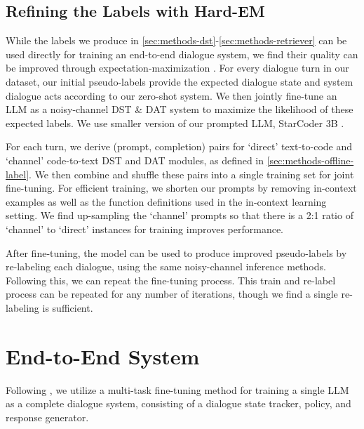 \documentclass[11pt]{article}
\begin{document}
\subsection{Refining the Labels with Hard-EM}
\label{sec:methods-re-labeling}

While the labels we produce in \autoref{sec:methods-dst}-\autoref{sec:methods-retriever} can be used directly for training an end-to-end dialogue system, we find their quality can be improved through expectation-maximization \cite{dempster_maximum_1977_fixed}.
For every dialogue turn in our dataset, our initial pseudo-labels provide the expected dialogue state and system dialogue acts according to our zero-shot system.
We then jointly fine-tune an LLM as a noisy-channel DST \& DAT system to maximize the likelihood of these expected labels.
We use smaller version of our prompted LLM, StarCoder 3B \cite{li2023starcoder}.

For each turn, we derive (prompt, completion) pairs for `direct' text-to-code and `channel' code-to-text DST and DAT modules, as defined in \autoref{sec:methods-offline-label}.
We then combine and shuffle these pairs into a single training set for joint fine-tuning.
For efficient training, we shorten our prompts by removing in-context examples as well as the function definitions used in the in-context learning setting. 
We find up-sampling the `channel' prompts so that there is a 2:1 ratio of `channel' to `direct' instances for training improves performance. 

After fine-tuning, the model can be used to produce improved pseudo-labels by re-labeling each dialogue, using the same noisy-channel inference methods. Following this, we can repeat the fine-tuning process.
This train and re-label process can be repeated for any number of iterations, though we find a single re-labeling is sufficient.

\section{End-to-End System}
\label{sec:methods-online-system}

Following \cite{su-etal-2022-multi}, we utilize a multi-task fine-tuning method for training a single LLM as a complete dialogue system, consisting of a dialogue state tracker, policy, and response generator.
\end{document}
